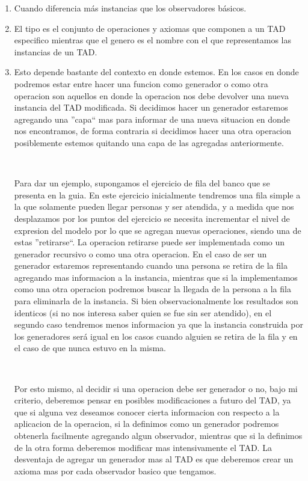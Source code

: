 \documentclass[10pt, a4paper]{article}
\begin{document}
\begin{enumerate}
 \item Cuando diferencia m\'as instancias que los observadores b\'asicos.
 \item El tipo es el conjunto de operaciones y axiomas que componen a un TAD especifico mientras que el genero es el nombre con el que representamos las instancias de un TAD.
 \item Esto depende bastante del contexto en donde estemos. En los casos en donde podremos estar entre hacer una funcion como generador o como otra operacion son aquellos en donde la operacion nos debe devolver una nueva instancia del TAD modificada. Si decidimos hacer un generador estaremos agregando una ''capa`` mas para informar de una nueva situacion en donde nos encontramos, de forma contraria si decidimos hacer una otra operacion posiblemente estemos quitando una capa de las agregadas anteriormente. 
 
 ~
 
 Para dar un ejemplo, supongamos el ejercicio de fila del banco que se presenta en la guia. En este ejercicio inicialmente tendremos una fila simple a la que solamente pueden llegar personas y ser atendida, y a medida que nos desplazamos por los puntos del ejercicio se necesita incrementar el nivel de expresion del modelo por lo que se agregan nuevas operaciones, siendo una de estas ''retirarse``. La operacion retirarse puede ser implementada como un generador recursivo o como una otra operacion. En el caso de ser un generador estaremos representando cuando una persona se retira de la fila agregando mas informacion a la instancia, mientras que si la implementamos como una otra operacion podremos buscar la llegada de la persona a la fila para eliminarla de la instancia. Si bien observacionalmente los resultados son identicos (si no nos interesa saber quien se fue sin ser atendido), en el segundo caso tendremos menos informacion ya que la instancia construida por los generadores ser\'a igual en los casos 
cuando alguien se retira de la fila y en el caso de que nunca estuvo en la misma.
 
 ~
 
 Por esto mismo, al decidir si una operacion debe ser generador o no, bajo mi criterio, deberemos pensar en posibles modificaciones a futuro del TAD, ya que si alguna vez deseamos conocer cierta informacion con respecto a la aplicacion de la operacion, si la definimos como un generador podremos obtenerla facilmente agregando algun observador, mientras que si la definimos de la otra forma deberemos modificar mas intensivamente el TAD. La desventaja de agregar un generador mas al TAD es que deberemos crear un axioma mas por cada observador basico que tengamos. 
\end{enumerate}
\end{document}

